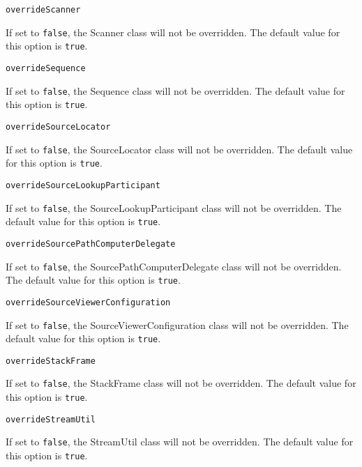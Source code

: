 \noindent\texttt{overrideScanner}
\begin{myindentpar}{1cm}
If set to \texttt{false}, the Scanner class will not be overridden. The default value for this option is \texttt{true}.
\end{myindentpar}

\noindent\texttt{overrideSequence}
\begin{myindentpar}{1cm}
If set to \texttt{false}, the Sequence class will not be overridden. The default value for this option is \texttt{true}.
\end{myindentpar}

\noindent\texttt{overrideSourceLocator}
\begin{myindentpar}{1cm}
If set to \texttt{false}, the SourceLocator class will not be overridden. The default value for this option is \texttt{true}.
\end{myindentpar}

\noindent\texttt{overrideSourceLookupParticipant}
\begin{myindentpar}{1cm}
If set to \texttt{false}, the SourceLookupParticipant class will not be overridden. The default value for this option is \texttt{true}.
\end{myindentpar}

\noindent\texttt{overrideSourcePathComputerDelegate}
\begin{myindentpar}{1cm}
If set to \texttt{false}, the SourcePathComputerDelegate class will not be overridden. The default value for this option is \texttt{true}.
\end{myindentpar}

\noindent\texttt{overrideSourceViewerConfiguration}
\begin{myindentpar}{1cm}
If set to \texttt{false}, the SourceViewerConfiguration class will not be overridden. The default value for this option is \texttt{true}.
\end{myindentpar}

\noindent\texttt{overrideStackFrame}
\begin{myindentpar}{1cm}
If set to \texttt{false}, the StackFrame class will not be overridden. The default value for this option is \texttt{true}.
\end{myindentpar}

\noindent\texttt{overrideStreamUtil}
\begin{myindentpar}{1cm}
If set to \texttt{false}, the StreamUtil class will not be overridden. The default value for this option is \texttt{true}.
\end{myindentpar}

